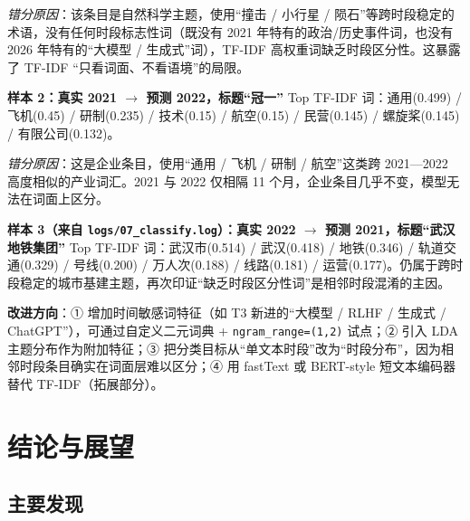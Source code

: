 \documentclass[12pt,a4paper]{article}
\begin{document}
\textit{错分原因}：该条目是自然科学主题，使用“撞击 / 小行星 / 陨石”等跨时段稳定的术语，没有任何时段标志性词（既没有 2021 年特有的政治/历史事件词，也没有 2026 年特有的“大模型 / 生成式”词），TF-IDF 高权重词缺乏时段区分性。这暴露了 TF-IDF “只看词面、不看语境”的局限。

\textbf{样本 2：真实 2021 $\rightarrow$ 预测 2022，标题“冠一”}
Top TF-IDF 词：通用(0.499) / 飞机(0.45) / 研制(0.235) / 技术(0.15) / 航空(0.15) / 民营(0.145) / 螺旋桨(0.145) / 有限公司(0.132)。

\textit{错分原因}：这是企业条目，使用“通用 / 飞机 / 研制 / 航空”这类跨 2021—2022 高度相似的产业词汇。2021 与 2022 仅相隔 11 个月，企业条目几乎不变，模型无法在词面上区分。

\textbf{样本 3（来自 \texttt{logs/07\_classify.log}）：真实 2022 $\rightarrow$ 预测 2021，标题“武汉地铁集团”} Top TF-IDF 词：武汉市(0.514) / 武汉(0.418) / 地铁(0.346) / 轨道交通(0.329) / 号线(0.200) / 万人次(0.188) / 线路(0.181) / 运营(0.177)。仍属于跨时段稳定的城市基建主题，再次印证“缺乏时段区分性词”是相邻时段混淆的主因。

\textbf{改进方向}：① 增加时间敏感词特征（如 T3 新进的“大模型 / RLHF / 生成式 / ChatGPT”），可通过自定义二元词典 + \texttt{ngram\_range=(1,2)} 试点；② 引入 LDA 主题分布作为附加特征；③ 把分类目标从“单文本时段”改为“时段分布”，因为相邻时段条目确实在词面层难以区分；④ 用 fastText 或 BERT-style 短文本编码器替代 TF-IDF（拓展部分）。

\section{结论与展望}

\subsection{主要发现}
\end{document}
